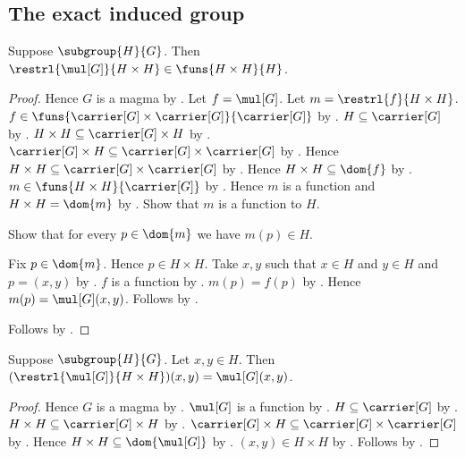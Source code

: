 \subsection{The exact induced group}

\begin{proposition}\label{subgroup_mul_restriction_type}
    Suppose $\subgroup{H}{G}$.
    Then
        $\restrl{\mul[G]}{H\times H}\in\funs{H\times H}{H}$.
\end{proposition}
\begin{proof}
    Hence $G$ is a magma by
        .
    Let $f=\mul[G]$.
    Let $m=\restrl{f}{H\times H}$.
    $f\in
        \funs{\carrier[G]\times\carrier[G]}{\carrier[G]}$ by
        .
    $H\subseteq\carrier[G]$ by .
    $H\times H\subseteq\carrier[G]\times H$ by
        .
    $\carrier[G]\times H
        \subseteq\carrier[G]\times\carrier[G]$ by
        .
    Hence $H\times H
        \subseteq\carrier[G]\times\carrier[G]$ by
        .
    Hence $H\times H\subseteq\dom{f}$ by .
    $m\in\funs{H\times H}{\carrier[G]}$ by
        .
    Hence $m$ is a function and $H\times H=\dom{m}$ by
        .
    Show that $m$ is a function to $H$.
    \begin{subproof}
        Show that for every $p\in\dom{m}$ we have $m(p)\in H$.
        \begin{subproof}
            Fix $p\in\dom{m}$.
            Hence $p\in H\times H$.
            Take $x,y$ such that $x\in H$ and $y\in H$ and
                $p=(x,y)$ by .
            $f$ is a function by .
            $m(p)=f(p)$ by .
            Hence $m(p)=\mul[G](x,y)$.
            Follows by .
        \end{subproof}
    \end{subproof}
    Follows by .
\end{proof}

\begin{proposition}\label{subgroup_mul_restriction_apply}
    Suppose $\subgroup{H}{G}$.
    Let $x,y\in H$.
    Then
        $(\restrl{\mul[G]}{H\times H})(x,y)=\mul[G](x,y)$.
\end{proposition}
\begin{proof}
    Hence $G$ is a magma by
        .
    $\mul[G]$ is a function by
        .
    $H\subseteq\carrier[G]$ by .
    $H\times H\subseteq\carrier[G]\times H$ by
        .
    $\carrier[G]\times H
        \subseteq\carrier[G]\times\carrier[G]$ by
        .
    Hence $H\times H\subseteq\dom{\mul[G]}$ by
        .
    $(x,y)\in H\times H$ by .
    Follows by .
\end{proof}

